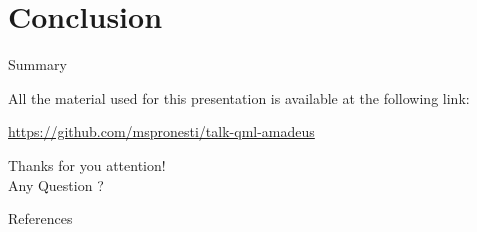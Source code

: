 \documentclass[10pt]{beamer}
\begin{document}
	\section{Conclusion}
	
	\begin{frame}{Summary}
		
		All the material used for this presentation is available at the following link:
		
		\begin{center}
			\url{https://github.com/mspronesti/talk-qml-amadeus}
		\end{center}
		
		\begin{center}\ccbysa\end{center}
		
	\end{frame}
	
	
	{
		\begin{frame}[standout]
			Thanks for you attention!\\ Any Question ?
		\end{frame}
	}
	
	\appendix
	
	
	\begin{frame}[allowframebreaks]{References}
		
		
	\end{frame}
	
\end{document}
